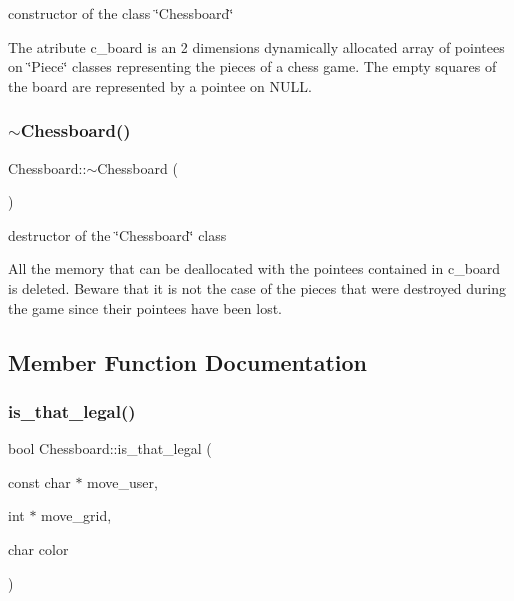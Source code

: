 constructor of the class \char`\"{}\+Chessboard\char`\"{} 

The atribute c\+\_\+board is an 2 dimensions dynamically allocated array of pointees on \char`\"{}\+Piece\char`\"{} classes representing the pieces of a chess game. The empty squares of the board are represented by a pointee on N\+U\+LL. \mbox{\label{classChessboard_a53eac522998d8d92cca409493c773f54}} 
\subsubsection{\texorpdfstring{$\sim$\+Chessboard()}{~Chessboard()}}
{\footnotesize\ttfamily Chessboard\+::$\sim$\+Chessboard (\begin{DoxyParamCaption}{ }\end{DoxyParamCaption})}



destructor of the \char`\"{}\+Chessboard\char`\"{} class 

All the memory that can be deallocated with the pointees contained in c\+\_\+board is deleted. Beware that it is not the case of the pieces that were destroyed during the game since their pointees have been lost. 

\subsection{Member Function Documentation}
\mbox{\label{classChessboard_a12ff4ac86a41d525388465e1a552fa11}} 
\subsubsection{\texorpdfstring{is\+\_\+that\+\_\+legal()}{is\_that\_legal()}}
{\footnotesize\ttfamily bool Chessboard\+::is\+\_\+that\+\_\+legal (\begin{DoxyParamCaption}\item[{const char $\ast$}]{move\+\_\+user,  }\item[{int $\ast$}]{move\+\_\+grid,  }\item[{char}]{color }\end{DoxyParamCaption})}



